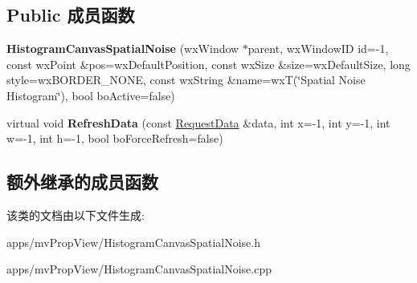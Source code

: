 \subsection*{Public 成员函数}
\begin{DoxyCompactItemize}
\item 
\hypertarget{class_histogram_canvas_spatial_noise_a53fdb2b3211dfb8f41ab88f7ce1e345e}{{\bfseries Histogram\+Canvas\+Spatial\+Noise} (wx\+Window $\ast$parent, wx\+Window\+I\+D id=-\/1, const wx\+Point \&pos=wx\+Default\+Position, const wx\+Size \&size=wx\+Default\+Size, long style=wx\+B\+O\+R\+D\+E\+R\+\_\+\+N\+O\+N\+E, const wx\+String \&name=wx\+T(\char`\"{}Spatial Noise Histogram\char`\"{}), bool bo\+Active=false)}\label{class_histogram_canvas_spatial_noise_a53fdb2b3211dfb8f41ab88f7ce1e345e}

\item 
\hypertarget{class_histogram_canvas_spatial_noise_aef6f5d3b20d16504e81552995c803753}{virtual void {\bfseries Refresh\+Data} (const \hyperlink{struct_request_data}{Request\+Data} \&data, int x=-\/1, int y=-\/1, int w=-\/1, int h=-\/1, bool bo\+Force\+Refresh=false)}\label{class_histogram_canvas_spatial_noise_aef6f5d3b20d16504e81552995c803753}

\end{DoxyCompactItemize}
\subsection*{额外继承的成员函数}


该类的文档由以下文件生成\+:\begin{DoxyCompactItemize}
\item 
apps/mv\+Prop\+View/Histogram\+Canvas\+Spatial\+Noise.\+h\item 
apps/mv\+Prop\+View/Histogram\+Canvas\+Spatial\+Noise.\+cpp\end{DoxyCompactItemize}
